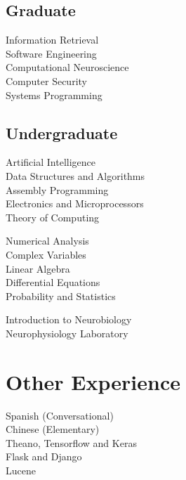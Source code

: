 \documentclass[letterpaper]{deedy-resume} %
\begin{document}
\begin{minipage}[t]{0.33\textwidth}
\subsection{Graduate}

Information Retrieval\\
Software Engineering \\
Computational Neuroscience \\
Computer Security \\
Systems Programming \\

\sectionspace %


\subsection{Undergraduate}

Artificial Intelligence \\
Data Structures and Algorithms \\
Assembly Programming \\
Electronics and Microprocessors \\
Theory of Computing \\

\vspace{1mm}

Numerical Analysis \\
Complex Variables \\
Linear Algebra \\
Differential Equations \\
Probability and Statistics \\

\vspace{1mm}

Introduction to Neurobiology \\
Neurophysiology Laboratory \\

\section{Other Experience}

Spanish (Conversational) \\
Chinese (Elementary) \\
Theano, Tensorflow and Keras \\
Flask and Django \\
Lucene \\

\sectionspace %


\end{minipage} %
\end{document}
